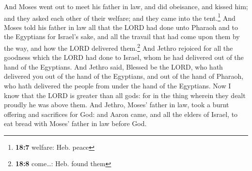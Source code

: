  And Moses went out to meet his father in law, and did
obeisance, and kissed him; and they asked each other of their welfare;
and they came into the tent.\footnote{\textbf{18:7} welfare: Heb. peace}
 And Moses told his father in law all that the LORD had
done unto Pharaoh and to the Egyptians for Israel's sake, and all the
travail that had come upon them by the way, and how the LORD delivered
them.\footnote{\textbf{18:8} come\ldots: Heb. found them} 
And Jethro rejoiced for all the goodness which the LORD had done to
Israel, whom he had delivered out of the hand of the Egyptians.
 And Jethro said, Blessed be the LORD, who hath delivered
you out of the hand of the Egyptians, and out of the hand of Pharaoh,
who hath delivered the people from under the hand of the Egyptians.
 Now I know that the LORD is greater than all gods: for
in the thing wherein they dealt proudly he was above them.
 And Jethro, Moses' father in law, took a burnt offering
and sacrifices for God: and Aaron came, and all the elders of Israel, to
eat bread with Moses' father in law before God.

